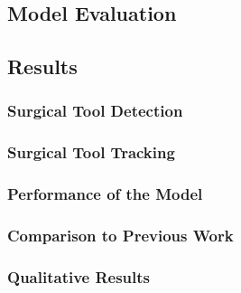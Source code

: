 \subsection{Model Evaluation}


\subsection{Results}


\subsubsection{Surgical Tool Detection}



\subsubsection{Surgical Tool Tracking}



\subsubsection{Performance of the Model}




\subsubsection{Comparison to Previous Work}

\subsubsection{Qualitative Results}

